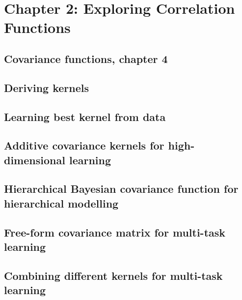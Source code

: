 \documentclass[12pt]{article}
\begin{document}
\section{Chapter 2: Exploring Correlation Functions}




\subsection{Covariance functions, chapter 4 \cite{gp-ml}}




\subsection{Deriving kernels \cite{deriving-kernels}}




\subsection{Learning best kernel from data \cite{choosing-kernels}}



\subsection{Additive covariance kernels for high-dimensional learning \cite{additive-kernels}}




\subsection{Hierarchical Bayesian covariance function for hierarchical modelling \cite{hierarchical-kernels}}




\subsection{Free-form covariance matrix for multi-task learning \cite{freeform-kernels}}




\subsection{Combining different kernels for multi-task learning \cite{multi-kernels}}
\end{document}
